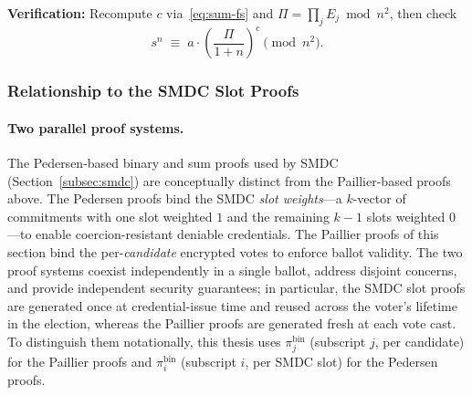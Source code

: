 \textbf{Verification:} Recompute $c$ via~\eqref{eq:sum-fs} and $\Pi = \prod_j E_j \bmod n^2$, then check
\begin{equation*}
    s^{n} \;\equiv\; a \cdot \left(\dfrac{\Pi}{1+n}\right)^{c} \pmod{n^2}.
\end{equation*}

\subsubsection{Relationship to the SMDC Slot Proofs}
\label{subsubsec:zkp-smdc-distinction}

\paragraph{Two parallel proof systems.} The Pedersen-based binary and sum proofs used by SMDC (Section~\ref{subsec:smdc}) are conceptually distinct from the Paillier-based proofs above. The Pedersen proofs bind the SMDC \emph{slot weights}---a $k$-vector of commitments with one slot weighted $1$ and the remaining $k-1$ slots weighted $0$---to enable coercion-resistant deniable credentials. The Paillier proofs of this section bind the per-\emph{candidate} encrypted votes to enforce ballot validity. The two proof systems coexist independently in a single ballot, address disjoint concerns, and provide independent security guarantees; in particular, the SMDC slot proofs are generated once at credential-issue time and reused across the voter's lifetime in the election, whereas the Paillier proofs are generated fresh at each vote cast. To distinguish them notationally, this thesis uses $\pi_j^{\text{bin}}$ (subscript $j$, per candidate) for the Paillier proofs and $\pi_i^{\text{bin}}$ (subscript $i$, per SMDC slot) for the Pedersen proofs.

